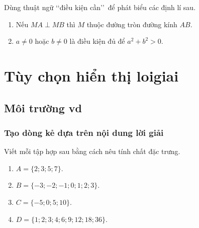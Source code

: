 \documentclass[Main.tex]{subfiles}
\begin{document}
	\begin{bt}%
		Dùng thuật ngữ \lq\lq điều kiện cần\rq\rq\ để phát biểu các định lí sau.
		\begin{enumerate}
			\item Nếu $MA\perp MB$ thì $M$ thuộc đường tròn đường kính $AB$.
			\item $a\ne 0$ hoặc $b\ne 0$ là điều kiện đủ để $a^2+b^2>0$.
		\end{enumerate}
	\end{bt}
	\timhieuthem
	
	\section{Tùy chọn hiển thị loigiai}
	\subsection{Môi trường vd}
	\subsubsection{Tạo dòng kẻ dựa trên nội dung lời giải}
	\dongkevd
	\begin{vd}%
		Viết mỗi tập hợp sau bằng cách nêu tính chất đặc trưng.
		\begin{multicols}{2}
			\begin{enumerate}
				\item $A=\{2;3;5;7\}$.
				\item $B=\{-3;-2;-1;0;1;2;3\}$.
				\item $C=\{-5;0;5;10\}$.
				\item $D=\{1;2;3;4;6;9;12;18;36\}$.
			\end{enumerate}
		\end{multicols}
	\end{vd}
	
\end{document}
